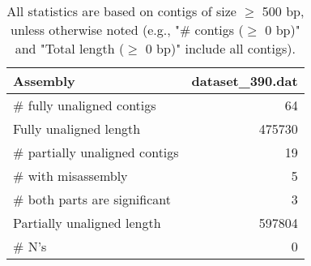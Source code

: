 \documentclass[12pt,a4paper]{article}
\begin{document}
\begin{table}[ht]
\begin{center}
\caption{All statistics are based on contigs of size $\geq$ 500 bp, unless otherwise noted (e.g., "\# contigs ($\geq$ 0 bp)" and "Total length ($\geq$ 0 bp)" include all contigs).}
\begin{tabular}{|l*{1}{|r}|}
\hline
Assembly & dataset\_390.dat \\ \hline
\# fully unaligned contigs & 64 \\ \hline
Fully unaligned length & 475730 \\ \hline
\# partially unaligned contigs & 19 \\ \hline
\hspace{5mm}\# with misassembly & 5 \\ \hline
\hspace{5mm}\# both parts are significant & 3 \\ \hline
Partially unaligned length & 597804 \\ \hline
\# N's & 0 \\ \hline
\end{tabular}
\end{center}
\end{table}
\end{document}

